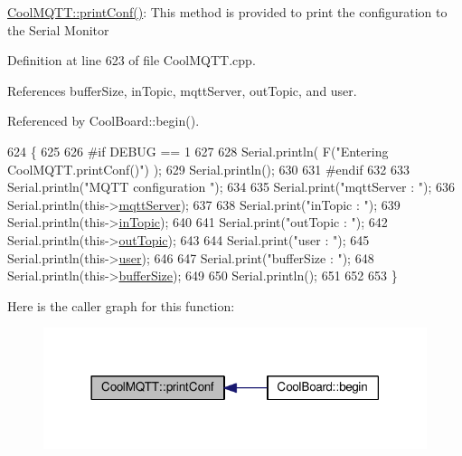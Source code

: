 \hyperlink{classCoolMQTT_a40553a0ad4b5ecf1cb4411ab54ca85fb}{Cool\+M\+Q\+T\+T\+::print\+Conf()}\+: This method is provided to print the configuration to the Serial Monitor 

Definition at line 623 of file Cool\+M\+Q\+T\+T.\+cpp.



References buffer\+Size, in\+Topic, mqtt\+Server, out\+Topic, and user.



Referenced by Cool\+Board\+::begin().


\begin{DoxyCode}
624 \{
625 
626 \textcolor{preprocessor}{#if DEBUG == 1 }
627 
628     Serial.println( F(\textcolor{stringliteral}{"Entering CoolMQTT.printConf()"}) );
629     Serial.println();   
630 
631 \textcolor{preprocessor}{#endif}
632     
633     Serial.println(\textcolor{stringliteral}{"MQTT configuration "});
634 
635     Serial.print(\textcolor{stringliteral}{"mqttServer : "});
636     Serial.println(this->\hyperlink{classCoolMQTT_ab8bb951f87ddbf92db74c2ad16a3e53e}{mqttServer});
637 
638     Serial.print(\textcolor{stringliteral}{"inTopic : "});
639     Serial.println(this->\hyperlink{classCoolMQTT_a4492f52a441e83cc5151010317fdb52d}{inTopic});
640 
641     Serial.print(\textcolor{stringliteral}{"outTopic : "});
642     Serial.println(this->\hyperlink{classCoolMQTT_a109c786a17b463f9eeba046194279522}{outTopic});
643 
644     Serial.print(\textcolor{stringliteral}{"user : "});
645     Serial.println(this->\hyperlink{classCoolMQTT_a8cd47e45d457f908d4b4390b35aaee83}{user});
646 
647     Serial.print(\textcolor{stringliteral}{"bufferSize : "});
648     Serial.println(this->\hyperlink{classCoolMQTT_a7f3cf26b51d6770f216e42c5ef13ca9f}{bufferSize});
649 
650     Serial.println();
651 
652 
653 \}
\end{DoxyCode}
Here is the caller graph for this function\+:
\nopagebreak
\begin{figure}[H]
\begin{center}
\leavevmode
\includegraphics[width=318pt]{classCoolMQTT_a40553a0ad4b5ecf1cb4411ab54ca85fb_icgraph}
\end{center}
\end{figure}
\mbox{\label{classCoolMQTT_ace977b3e90ab14b1199fe5c4fb0a13ec}} 
